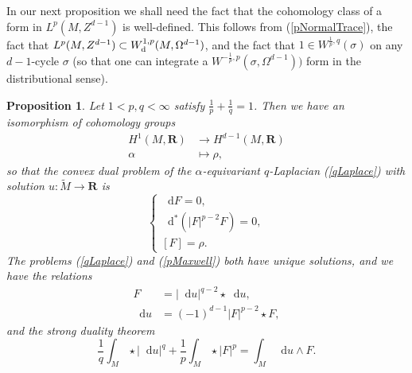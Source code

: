 \documentclass[reqno,11pt]{amsart}
\newcommand{\RR}{\mathbf{R}}
\newcommand*\dif{\mathop{}\!\mathrm{d}}
\newtheorem{proposition}[theorem]{Proposition}
\theoremstyle{definition}
\numberwithin{equation}{section}
\begin{document}
In our next proposition we shall need the fact that the cohomology class of a form in $L^p(M, Z^{d - 1})$ is well-defined.
This follows from (\ref{pNormalTrace}), the fact that $L^p(M, Z^{d - 1}) \subset W^{1, p}_{\rm d}(M, \Omega^{d - 1})$, and the fact that $1 \in W^{\frac{1}{p}, q}(\sigma)$ on any $d-1$-cycle $\sigma$ (so that one can integrate a $W^{-\frac{1}{p}, p}(\sigma, \Omega^{d - 1}))$ form in the distributional sense).

\begin{proposition}\label{convex duality}
Let $1 < p, q < \infty$ satisfy $\frac{1}{p} + \frac{1}{q} = 1$.
Then we have an isomorphism of cohomology groups
\begin{align*}
H^1(M, \RR) &\to H^{d - 1}(M, \RR) \\
\alpha &\mapsto \rho,
\end{align*}
so that the convex dual problem of the $\alpha$-equivariant $q$-Laplacian (\ref{qLaplace}) with solution $u: \tilde M \to \RR$ is
\begin{equation}\label{pMaxwell}
\begin{cases}
	\dif F = 0, \\
	\dif^*(|F|^{p - 2} F) = 0, \\
	[F] = \rho.
\end{cases}
\end{equation}
The problems (\ref{qLaplace}) and (\ref{pMaxwell}) both have unique solutions, and we have the relations
\begin{align}
F &= |\dif u|^{q - 2} \star \dif u, \label{extremality} \\
\dif u &= (-1)^{d - 1} |F|^{p - 2} \star F, \label{inverse extremality}
\end{align}
and the strong duality theorem 
\begin{equation}\label{strong duality}
\frac{1}{q} \int_M \star |\dif u|^q + \frac{1}{p} \int_M \star |F|^p = \int_M \dif u \wedge F.
\end{equation}
\end{proposition}
\end{document}
